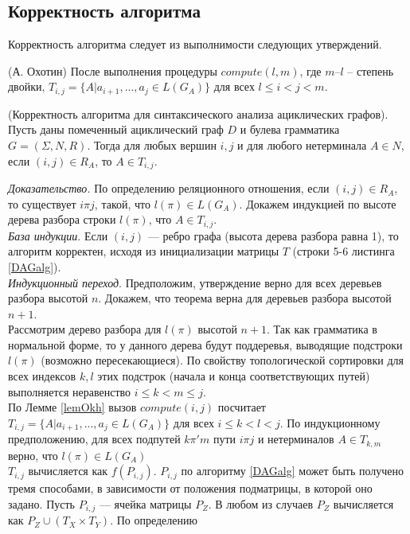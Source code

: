 \documentclass{spbau-diploma}
\begin{document}
\subsection {Корректность алгоритма} 
Корректность алгоритма следует из выполнимости следующих
утверждений.
\begin{lemmarus} \label{lemOkh} (А. Охотин) После выполнения процедуры $compute(l,m)$, где $m – l$ – степень двойки, $T_{i,j} = \{A | a_{i+1}, ... , a_{j} \in L(G_A)\}$ для всех $l \le i < j < m$.
\end{lemmarus}
\begin{theoremrus} (Корректность алгоритма для синтаксического
анализа ациклических графов). Пусть даны помеченный
ациклический граф $D$ и булева грамматика $G = (\Sigma, N, R)$.
Тогда для любых вершин $i, j$ и для любого нетерминала $A \in N$, если
$(i, j) \in R_A$, то $A \in T_{i,j}$.
\end{theoremrus}
\textit{Доказательство.}  По определению реляционного отношения, если $(i, j) \in R_A$, то существует $i \pi j$, такой, что $l(\pi) \in L(G_A)$. Докажем индукцией по высоте дерева разбора строки $l(\pi)$, что $A \in T_{i,j}$.
\\
\textit{База индукции}. Если $(i, j)$ --- ребро графа (высота дерева разбора равна 1), то алгоритм корректен, исходя из инициализации
матрицы $T$ (строки 5-6 листинга \ref{DAGalg}).
\\
\textit{Индукционный переход}. Предположим, утверждение верно для
всех деревьев разбора высотой $n$. Докажем, что теорема верна для
деревьев разбора высотой $n+1$.
\\
Рассмотрим дерево разбора для $l(\pi)$ высотой $n+1$. Так как
грамматика в нормальной форме, то у данного дерева будут
поддеревья, выводящие подстроки $l(\pi)$ (возможно
пересекающиеся). По свойству топологической сортировки для
всех индексов $k,l$ этих подстрок (начала и конца соответствующих
путей) выполняется неравенство $i \le k < m \le j$. 
\\По Лемме \ref{lemOkh} вызов
$compute(i, j)$ посчитает $T_{i,j} = \{A | a_{i+1}, ... , a_{j} \in L(G_A)\}$ для всех $i \le k < l < j$. По индукционному предположению, для всех подпутей
$k \pi' m$ пути $i \pi j$ и нетерминалов $A \in T_{k,m}$ верно, что $l(\pi) \in L(G_A)$
\\
$T_{i,j}$
вычисляется как $f(P_{i,j})$. $P_{i,j}$ по алгоритму \ref{DAGalg} может быть получено
тремя способами, в зависимости от положения подматрицы, в
которой оно задано. Пусть $P_{i,j}$ --- ячейка матрицы $P_Z$. В любом из
случаев  $P_Z$ вычисляется как $P_Z \cup (T_X \times T_Y)$. По определению
\end{document}
